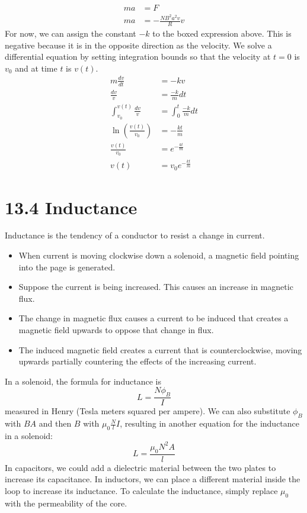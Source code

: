 \documentclass[12pt, titlepage]{article}
\begin{document}
\begin{align*}
    ma &= F \\
    ma &= \boxed{-\frac{NB^2a^2v}{R}}v
\end{align*}
For now, we can assign the constant $-k$ to the boxed expression above. This is negative because it is in the opposite direction as the velocity. We solve a differential equation by setting integration bounds so that the velocity at $t=0$ is $v_0$ and at time $t$ is $v(t)$.
\begin{align*}
    m\frac{dv}{dt} &= -kv \\
    \frac{dv}{v} &= \frac{-k}{m} dt \\
    \int_{v_0}^{v(t)} \frac{dv}{v} &= \int_{0}^{t} \frac{-k}{m}dt \\
    \ln (\frac{v(t)}{v_0})&=-\frac{kt}{m} \\
    \frac{v(t)}{v_0}&=e^{-\frac{kt}{m}} \\
    v(t) &= v_0e^{-\frac{kt}{m}}
\end{align*}

\section*{13.4 Inductance}

Inductance is the tendency of a conductor to resist a change in current.
\begin{itemize}
    \item When current is moving clockwise down a solenoid, a magnetic field pointing into the page is generated.
    \item Suppose the current is being increased. This causes an increase in magnetic flux.
    \item The change in magnetic flux causes a current to be induced that creates a magnetic field upwards to oppose that change in flux.
    \item The induced magnetic field creates a current that is counterclockwise, moving upwards partially countering the effects of the increasing current.
\end{itemize}
In a solenoid, the formula for inductance is
\begin{equation*}
    L=\frac{N\phi_B}{I}
\end{equation*}
measured in Henry (Tesla meters squared per ampere). We can also substitute $\phi_B$ with $BA$ and then $B$ with $\mu_0 \frac{N}{l}I$, resulting in another equation for the inductance in a solenoid:
\begin{equation*}
    L= \frac{\mu_0N^2A}{l}
\end{equation*}
In capacitors, we could add a dielectric material between the two plates to increase its capacitance. In inductors, we can place a different material inside the loop to increase its inductance. To calculate the inductance, simply replace $\mu_0$ with the permeability of the core.
\end{document}
